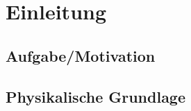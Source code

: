 \chapter{Einleitung}

\section{Aufgabe/Motivation}
\section{Physikalische Grundlage}
\cite{demtroeder17,skript25}

